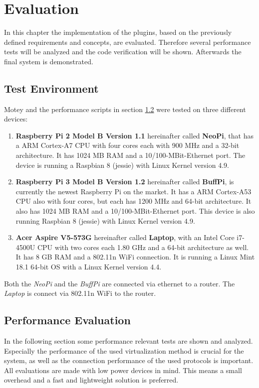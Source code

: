 \chapter{Evaluation}
\label{chapter:evaluation}
\minitoc\vspace{.5cm}
In this chapter the implementation of the plugins, based on the previously defined requirements and concepts, are evaluated.
Therefore several performance tests will be analyzed and the code verification will be shown.
Afterwards the final system is demonstrated.

\section{Test Environment}
\label{section:test-environment}
Motey and the performance scripts in section \ref{section:performance-evaluation} were tested on three different devices:

\begin{enumerate}
  \item \textbf{Raspberry Pi 2 Model B Version 1.1} hereinafter called \textbf{NeoPi}, that has a ARM Cortex-A7 \ac{CPU} with four cores each with 900 MHz and a 32-bit architecture. It has 1024 MB \ac{RAM} and a 10/100-MBit-Ethernet port. The device is running a Raspbian 8 (jessie) with Linux Kernel version 4.9.
  \item \textbf{Raspberry Pi 3 Model B Version 1.2} hereinafter called \textbf{BuffPi}, is currently the newest Raspberry Pi on the market. It has a ARM Cortex-A53 \ac{CPU} also with four cores, but each has 1200 MHz and 64-bit architecture. It also has 1024 MB \ac{RAM} and a 10/100-MBit-Ethernet port.  This device is also running Raspbian 8 (jessie) with Linux Kernel version 4.9.
  \item \textbf{Acer Aspire V5-573G} hereinafter called \textbf{Laptop}, with an Intel Core i7-4500U \ac{CPU} with two cores each 1.80 GHz and a 64-bit architecture as well. It has 8 GB \ac{RAM} and a 802.11n WiFi connection. It is running a Linux Mint 18.1  64-bit \ac{OS} with a Linux Kernel version 4.4.
\end{enumerate}
\bigskip

Both the \textit{NeoPi} and the \textit{BuffPi} are connected via ethernet to a router.
The \textit{Laptop} is connect via 802.11n WiFi to the router.

\section{Performance Evaluation}
\label{section:performance-evaluation}
In the following section some performance relevant tests are shown and analyzed.
Especially the performance of the used virtualization method is crucial for the system, as well as the connection performance of the used protocols is important.
All evaluations are made with low power devices in mind.
This means a small overhead and a fast and lightweight solution is preferred.

